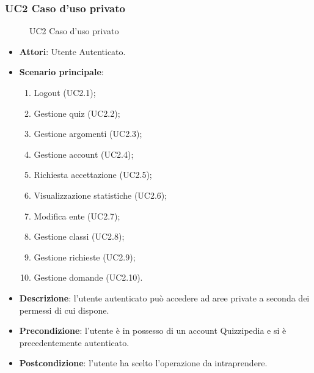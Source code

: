 \subsubsection{UC2 Caso d'uso privato}
\begin{figure}[H]
\centering
\noindent{}
\caption{UC2 Caso d'uso privato}
\end{figure}
\begin{itemize}
\item \textbf{Attori}: Utente Autenticato.
\item \textbf{Scenario principale}:
\begin{enumerate}
\item Logout (UC2.1);
\item Gestione quiz (UC2.2);
\item Gestione argomenti (UC2.3);
\item Gestione account (UC2.4);
\item Richiesta accettazione (UC2.5);
\item Visualizzazione statistiche (UC2.6);
\item Modifica ente (UC2.7);
\item Gestione classi (UC2.8);
\item Gestione richieste (UC2.9);
\item Gestione domande (UC2.10).
\end{enumerate}
\item \textbf{Descrizione}: l'utente autenticato può accedere ad aree private a seconda dei permessi di cui dispone.
\item \textbf{Precondizione}: l'utente è in possesso di un account Quizzipedia e si è precedentemente autenticato.
\item \textbf{Postcondizione}: l'utente ha scelto l'operazione da intraprendere.
\end{itemize}
